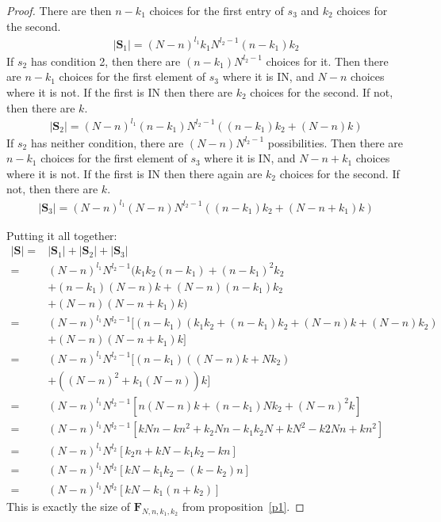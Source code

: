 \documentclass{article}
\newcommand{\fn}{\mathbf{F}_{N,n,k_1,k_2}}
\begin{document}
\begin{proof}
There are then $n-k_1$ choices for the first entry of $s_3$ and $k_2$ choices for the second.
\begin{align*}
    |\mathbf{S}_1| = (N-n)^{l_1}k_1N^{l_2-1}(n-k_1)k_2
\end{align*}
If $s_2$ has condition 2, then there are $(n-k_1)N^{l_2-1}$ choices for it. Then there are $n-k_1$ choices for the first element of $s_3$ where it is $\mathrm{IN}$, and $N-n$ choices where it is not. If the first is $\mathrm{IN}$ then there are $k_2$ choices for the second. If not, then there are $k$.
\begin{align*}
    |\mathbf{S}_2| = (N-n)^{l_1}(n-k_1)N^{l_2-1}((n-k_1)k_2 + (N-n)k)
\end{align*}
If $s_2$ has neither condition, there are $(N-n)N^{l_2-1}$ possibilities. Then there are $n-k_1$ choices for the first element of $s_3$ where it is $\mathrm{IN}$, and $N-n+k_1$ choices where it is not. If the first is $\mathrm{IN}$ then there again are $k_2$ choices for the second. If not, then there are $k$.
\begin{align*}
    |\mathbf{S}_3| = (N-n)^{l_1}(N-n)N^{l_2-1}((n-k_1)k_2 + (N-n+k_1)k)
\end{align*}

Putting it all together:
\begin{equation*}
    \begin{split}
    |\mathbf{S}| ={}& |\mathbf{S}_1| + |\mathbf{S}_2| + |\mathbf{S}_3|\\
    ={}& (N-n)^{l_1}N^{l_2-1}(k_1k_2(n-k_1) + (n-k_1)^2k_2 \\&+(n-k_1)(N-n)k + (N-n)(n-k_1)k_2 \\&+ (N-n)(N-n+k_1)k) \\
    ={}& (N-n)^{l_1}N^{l_2-1}[(n-k_1)(k_1k_2 + (n-k_1)k_2 + (N-n)k + (N-n)k_2)\\&+ (N-n)(N-n+k_1)k]
    \\
    ={}& (N-n)^{l_1}N^{l_2-1}[(n-k_1)((N-n)k + Nk_2)\\&+ ((N-n)^2 + k_1(N-n))k]\\
    ={}& (N-n)^{l_1}N^{l_2-1}[n(N-n)k + (n-k_1)Nk_2 + (N-n)^2k]\\
    ={}& (N-n)^{l_1}N^{l_2-1}[kNn - kn^2 +k_2Nn - k_1k_2N +kN^2 -k2Nn +kn^2]\\
    ={}& (N-n)^{l_1}N^{l_2}[k_2n +kN -k_1k_2 -kn]\\
    ={}& (N-n)^{l_1}N^{l_2}[kN - k_1k_2 - (k-k_2)n]\\
    ={}& (N-n)^{l_1}N^{l_2}[kN - k_1(n + k_2)]
\end{split}
\end{equation*}
This is exactly the size of $\fn$ from proposition~\ref{p1}.
\end{proof}
\end{document}
